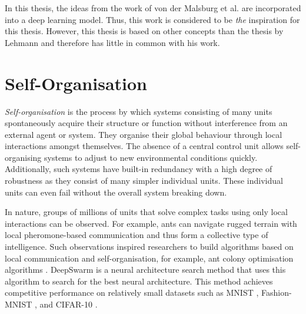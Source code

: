 In this thesis, the ideas from the work of von der Malsburg et al. \cite{von_der_Malsburg_Stadelmann_Grewe_2022} are incorporated into a deep learning model.
Thus, this work is considered to be \emph{the} inspiration for this thesis.
However, this thesis is based on other concepts than the thesis by Lehmann \cite{lehmann} and therefore has little in common with his work.



\section{Self-Organisation}
\emph{Self-organisation} is the process by which systems consisting of many units spontaneously acquire their structure or function without interference from an external agent or system.
They organise their global behaviour through local interactions amongst themselves.
The absence of a central control unit allows self-organising systems to adjust to new environmental conditions quickly.
Additionally, such systems have built-in redundancy with a high degree of robustness as they consist of many simpler individual units.
These individual units can even fail without the overall system breaking down.

In nature, groups of millions of units that solve complex tasks using only local interactions can be observed.
For example, ants can navigate rugged terrain with local pheromone-based communication and thus form a collective type of intelligence.
Such observations inspired researchers to build algorithms based on local communication and self-organisation, for example, ant colony optimisation algorithms .
DeepSwarm  is a neural architecture search method that uses this algorithm to search for the best neural architecture.
This method achieves competitive performance on relatively small datasets such as MNIST \cite{Lecun_Bottou_Bengio_Haffner_1998}, Fashion-MNIST \cite{xiao2017/online}, and CIFAR-10 \cite{cifar_10}.

